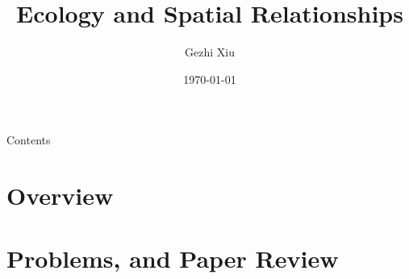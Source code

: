 \documentclass{beamer}
\title[Growth Models]{Ecology and Spatial Relationships}
\author[G. Xiu]{Gezhi Xiu} %
\institute[IRSGIS PKU]{Complexity Research Group,\\Peking University}
\date[\today]{\today}
\begin{document}
\maketitle
\begin{frame}{Contents}
\tableofcontents
\end{frame}

\section{Overview}

\section{Problems, and Paper Review}

\end{document}
